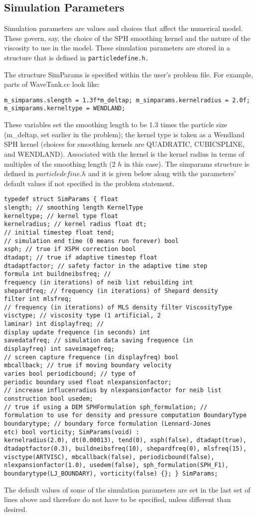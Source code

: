 \documentclass[12pt]{memoir}
\begin{document}
\subsection{Simulation Parameters}

Simulation parameters are values and choices that affect the numerical
model. These govern, say, the choice of the SPH smoothing kernel and
the nature of the viscosity to use in the model. These simulation
parameters are stored in a structure that is defined in
\verb!particledefine.h.!

The structure SimParams is specified within the user's problem file.
For example, parts of WaveTank.cc look like: 
\begin{verbatim}
m_simparams.slength = 1.3f*m_deltap; m_simparams.kernelradius = 2.0f;
m_simparams.kerneltype = WENDLAND; 
\end{verbatim} 
These variables set
the smoothing length to be 1.3 times the particle size (m\_deltap, set
earlier in the problem); the kernel type is taken as a Wendland SPH
kernel \cite{wendland_piecewise_1995} (choices for smoothing kernels are
QUADRATIC, CUBICSPLINE, and WENDLAND). Associated with the kernel is
the kernel radius in terms of multiples of the smoothing length (2 $h$
in this case). The simparams structure is defined in
$particledefine.h$ and it is given below along with the parameters'
default values if not specified in the problem statement.
\begin{verbatim} 
typedef struct SimParams { float
slength; // smoothing length KernelType
kerneltype; // kernel type float
kernelradius; // kernel radius float dt;
// initial timestep float tend;
// simulation end time (0 means run forever) bool
xsph; // true if XSPH correction bool
dtadapt; // true if adaptive timestep float
dtadaptfactor; // safety factor in the adaptive time step
formula int buildneibsfreq; //
frequency (in iterations) of neib list rebuilding int
shepardfreq; // frequency (in iterations) of Shepard density
filter int mlsfreq;
// frequency (in iterations) of MLS density filter ViscosityType
visctype; // viscosity type (1 artificial, 2
laminar) int displayfreq; //
display update frequence (in seconds) int
savedatafreq; // simulation data saving frequence (in
displayfreq) int saveimagefreq;
// screen capture frequence (in displayfreq) bool
mbcallback; // true if moving boundary velocity
varies bool periodicbound; // type of
periodic boundary used float nlexpansionfactor;
// increase influcenradius by nlexpansionfactor for neib list
construction bool usedem;
// true if using a DEM SPHFormulation sph_formulation; //
formulation to use for density and pressure computation BoundaryType
boundarytype; // boundary force formulation (Lennard-Jones
etc) bool vorticity; SimParams(void) :
kernelradius(2.0), dt(0.00013), tend(0), xsph(false), dtadapt(true),
dtadaptfactor(0.3), buildneibsfreq(10), shepardfreq(0), mlsfreq(15),
visctype(ARTVISC), mbcallback(false), periodicbound(false),
nlexpansionfactor(1.0), usedem(false), sph_formulation(SPH_F1),
boundarytype(LJ_BOUNDARY), vorticity(false) {}; } SimParams;
\end{verbatim} 
The default values of some of the simulation parameters
are set in the last set of lines above and therefore do not have to be
specified, unless different than desired.
\end{document}
